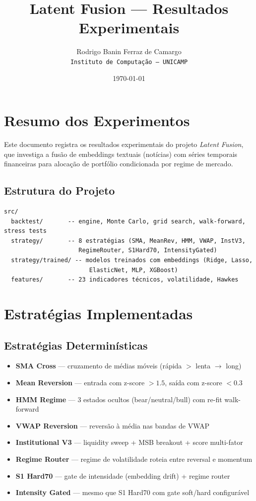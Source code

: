 \documentclass[11pt, a4paper]{article}
\title{Latent Fusion --- Resultados Experimentais}
\author{Rodrigo Banin Ferraz de Camargo \\ \texttt{Instituto de Computação -- UNICAMP}}
\date{\today}
\begin{document}
\maketitle

\section{Resumo dos Experimentos}

Este documento registra os resultados experimentais do projeto \textit{Latent Fusion}, que investiga a fusão de embeddings textuais (notícias) com séries temporais financeiras para alocação de portfólio condicionada por regime de mercado.

\subsection{Estrutura do Projeto}

\begin{verbatim}
src/
  backtest/       -- engine, Monte Carlo, grid search, walk-forward, stress tests
  strategy/       -- 8 estratégias (SMA, MeanRev, HMM, VWAP, InstV3, 
                     RegimeRouter, S1Hard70, IntensityGated)
  strategy/trained/ -- modelos treinados com embeddings (Ridge, Lasso, 
                        ElasticNet, MLP, XGBoost)
  features/       -- 23 indicadores técnicos, volatilidade, Hawkes
\end{verbatim}

\section{Estratégias Implementadas}

\subsection{Estratégias Determinísticas}

\begin{itemize}
    \item \textbf{SMA Cross} --- cruzamento de médias móveis (rápida $>$ lenta $\rightarrow$ long)
    \item \textbf{Mean Reversion} --- entrada com z-score $> 1.5$, saída com z-score $< 0.3$
    \item \textbf{HMM Regime} --- 3 estados ocultos (bear/neutral/bull) com re-fit walk-forward
    \item \textbf{VWAP Reversion} --- reversão à média nas bandas de VWAP
    \item \textbf{Institutional V3} --- liquidity sweep + MSB breakout + score multi-fator
    \item \textbf{Regime Router} --- regime de volatilidade roteia entre reversal e momentum
    \item \textbf{S1 Hard70} --- gate de intensidade (embedding drift) + regime router
    \item \textbf{Intensity Gated} --- mesmo que S1 Hard70 com gate soft/hard configurável
\end{itemize}
\end{document}
